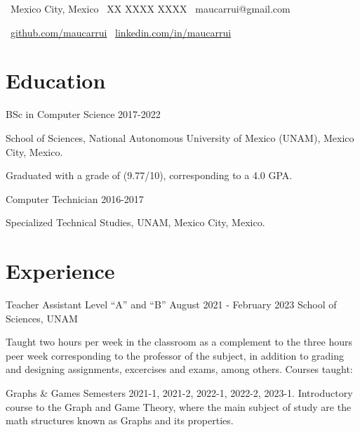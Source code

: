 \documentclass{curriculum-vitae}
\begin{document}
  \hypersetup{pageanchor=false}


  \vspace{1em}

  \contactPersonal%
      {\faMapMarker \ Mexico City, Mexico}
      {\faMobile \ XX XXXX XXXX}
      {\faEnvelopeO \ maucarrui@gmail.com}

  \vspace{1em}

  \contactSocial%
      {\faGithub
       \ \href{https://github.com/maucarrui}{github.com/maucarrui}}
      {\faLinkedinSquare
       \ \href{https://linkedin.com/in/maucarrui}{linkedin.com/in/maucarrui}}

  \section{Education}
    \datedsubsection%
        {BSc in Computer Science}
        {2017-2022}

        School of Sciences, National Autonomous University of Mexico (UNAM),
        Mexico City, Mexico.

        Graduated with a grade of (9.77/10), corresponding to a 4.0 GPA.

        \textcolor{Blue}{}

    \datedsubsection%
      {Computer Technician}
      {2016-2017}

      Specialized Technical Studies, UNAM, Mexico City, Mexico.


  \section{Experience}
    \experiencesubsection%
        {Teacher Assistant Level ``A'' and ``B''}
        {August 2021 - February 2023}
        {School of Sciences, UNAM}

        Taught two hours per week in the classroom as a complement to the three
        hours peer week corresponding to the professor of the subject, in
        addition to grading and designing assignments, excercises and exams,
        among others. Courses taught:

        \vspace{0.5em}

        \course%
            {Graphs \& Games}
            {Semesters 2021-1, 2021-2, 2022-1, 2022-2, 2023-1.}
            {Introductory course to the Graph and Game Theory, where the main
              subject of study are the math structures known as Graphs and its
              properties.}
\end{document}
